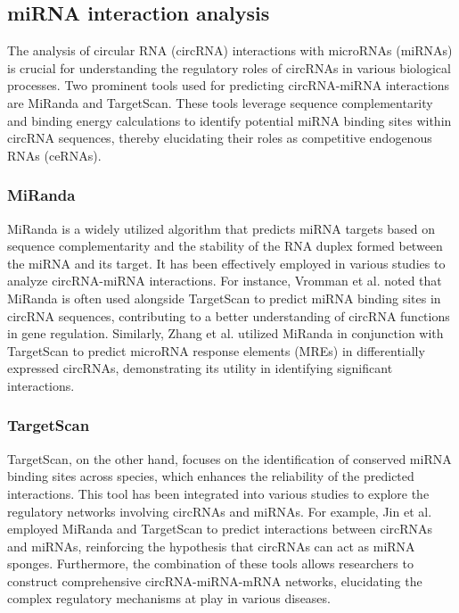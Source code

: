 \subsection{miRNA interaction analysis}
The analysis of circular RNA (circRNA) interactions with microRNAs (miRNAs) is
crucial for understanding the regulatory roles of circRNAs in various
biological processes.
Two prominent tools used for predicting circRNA-miRNA interactions are MiRanda
and TargetScan.
These tools leverage sequence complementarity and binding energy calculations
to identify potential miRNA binding sites within circRNA sequences, thereby
elucidating their roles as competitive endogenous RNAs (ceRNAs).

\subsubsection{MiRanda}
MiRanda is a widely utilized algorithm that predicts miRNA targets based on
sequence complementarity and the stability of the RNA duplex formed between the
miRNA and its target.
It has been effectively employed in various studies to analyze circRNA-miRNA
interactions.
For instance, Vromman et al.
noted that
MiRanda is often used alongside TargetScan to predict miRNA binding sites in
circRNA sequences, contributing to a better understanding of circRNA functions
in gene regulation\supercite{vromman_closing_2021}.
Similarly, Zhang et al.
utilized
MiRanda in conjunction with TargetScan to predict microRNA response elements
(MREs) in differentially expressed circRNAs, demonstrating its utility in
identifying significant interactions\supercite{zhang_microarray_2017}.

\subsubsection{TargetScan}
TargetScan, on the other hand, focuses on the identification of conserved miRNA
binding sites across species, which enhances the reliability of the predicted
interactions.
This tool has been integrated into various studies to explore the regulatory
networks involving circRNAs and miRNAs.
For example, Jin et al.
employed MiRanda and TargetScan to predict interactions between circRNAs and
miRNAs, reinforcing the hypothesis that circRNAs can act as miRNA
sponges\supercite{jin_changes_2018}.
Furthermore, the combination of these tools allows researchers to construct
comprehensive circRNA-miRNA-mRNA networks, elucidating the complex regulatory
mechanisms at play in various
diseases\supercite{he_construction_2021,zhang_construction_2021}.